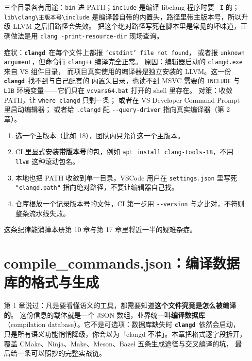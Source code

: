 \documentclass[12pt,a4paper,fontset=fandol]{ctexbook}
\newcommand{\Opt}[1]{\texttt{-\/-#1}}
\newcommand{\Lib}[1]{\textbf{\texttt{#1}}}
\newcommand{\CD}{\Lib{clangd}}
\begin{document}
三个目录各有用途：\texttt{bin} 进 PATH；\texttt{include} 是编译
libclang 程序时要 \texttt{-I} 的；
\texttt{lib\textbackslash clang\textbackslash 主版本号\textbackslash include}
是编译器自带的内置头，路径里带主版本号，所以升级 LLVM 之后旧路径会失效。
把这个绝对路径写死在脚本里是常见的坏味道，正确做法是用
\texttt{clang -print-resource-dir} 现场查询。

\begin{warning}[title={VS 自带 clang 与独立 LLVM 混装的典型症状}]
症状：\CD\ 在每个文件上都报 \texttt{'cstdint' file not found}，
或者报 \texttt{unknown argument}，但命令行 \texttt{clang++} 编译完全正常。
原因：编辑器启动的 \texttt{clangd.exe} 来自 VS 组件目录，
而项目真实使用的编译器是独立安装的 LLVM。这一份 \CD\ 找不到与自己配套的
内置头目录，也读不到 MSVC 需要的 \texttt{INCLUDE} 与 \texttt{LIB}
环境变量——它们只在 \texttt{vcvars64.bat} 打开的 shell 里存在。
对策：收敛 PATH，让 \texttt{where clangd} 只剩一条；
或者在 VS Developer Command Prompt 里启动编辑器；
或者给 \texttt{.clangd} 配 \Opt{query-driver} 指向真实编译器（第 2 章）。
\end{warning}

\begin{bestpractice}[title={把工具版本钉死的一次性投入}]
\begin{enumerate}
  \item 选一个主版本（比如 18），团队内只允许这一个主版本。
  \item CI 里显式安装\textbf{带版本号}的包，例如
        \texttt{apt install clang-tools-18}，不用 \texttt{llvm} 这种滚动包名。
  \item 本地也把 PATH 收敛到单一目录。VSCode 用户在
        \texttt{settings.json} 里写死
        \texttt{"clangd.path"} 指向绝对路径，不要让编辑器自己找。
  \item 仓库根放一个记录版本号的文件，CI 第一步用 \Opt{version}
        与之比对，不符则整条流水线失败。
\end{enumerate}
这条纪律能消掉本册第 10 章与第 17 章里将近一半的疑难杂症。
\end{bestpractice}

\chapter{compile\_commands.json：编译数据库的格式与生成}
\label{ch:compdb}

第 1 章说过：凡是要看懂语义的工具，都需要知道\textbf{这个文件究竟是怎么被编译的}。
这份信息的载体就是一个 JSON 数组，业界统一叫\textbf{编译数据库}
（compilation database）。它不是可选项：数据库缺失时 \CD\ 依然会启动，
只是所有语义功能悄悄降级，你会以为「clangd 不准」。本章把格式逐字段拆开，
覆盖 CMake、Ninja、Make、Meson、Bazel 五条生成途径与交叉编译的坑，
最后给一条可以照抄的完整实战链。
\end{document}
